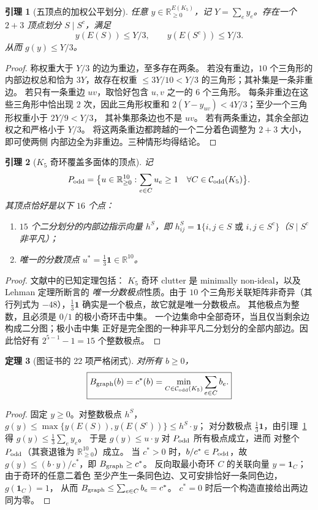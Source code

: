 \documentclass[11pt,a4paper]{ctexart}
\newtheorem{theorem}{定理}[section]
\newtheorem{lemma}[theorem]{引理}
\theoremstyle{remark}
\newcommand{\CE}{\mathcal C_{\rm odd}(K_5)}
\newcommand{\one}{\mathbf 1}
\newcommand{\N}{\mathbb R_{\ge0}}
\begin{document}
\begin{lemma}[五顶点的加权公平划分]\label{lem:split}
任意 $y\in\N^{E(K_5)}$，记 $Y=\sum_e y_e$。存在一个 $2+3$ 顶点划分
$S\mid S^c$，满足
\[
y(E(S))\le Y/3,\qquad y(E(S^c))\le Y/3.
\]
从而 $g(y)\le Y/3$。
\end{lemma}
\begin{proof}
称权重大于 $Y/3$ 的边为重边，至多存在两条。
若没有重边，$10$ 个三角形的内部边权总和恰为 $3Y$，故存在权重
$\le3Y/10<Y/3$ 的三角形；其补集是一条非重边。
若只有一条重边 $uv$，取恰好包含 $u,v$ 之一的 $6$ 个三角形。
每条非重边在这些三角形中恰出现 $2$ 次，因此三角形权重和
$2(Y-y_{uv})<4Y/3$；至少一个三角形权重小于 $2Y/9<Y/3$，
其补集那条边也不是 $uv$。
若有两条重边，其余全部边权之和严格小于 $Y/3$。
将这两条重边都跨越的一个二分着色调整为 $2+3$ 大小，即可使两侧
内部边全为非重边。三种情形均得结论。
\end{proof}

\begin{lemma}[$K_5$ 奇环覆盖多面体的顶点]\label{lem:cover}
记
\[
P_{\rm odd}=\bigl\{u\in\N^{10}:\sum_{e\in C}u_e\ge1\quad\forall C\in\CE\bigr\}.
\]
其顶点恰好是以下 $16$ 个点：
\begin{enumerate}
\item $15$ 个二分划分的内部边指示向量 $h^S$，即
$h^S_{ij}=\mathbf1\{i,j\in S\text{ 或 }i,j\in S^c\}$（$S\mid S^c$ 非平凡）；
\item 唯一的分数顶点 $u^*=\tfrac13\one\in\mathbb R^{10}$。
\end{enumerate}
\end{lemma}
\begin{proof}
文献\cite{cornuejols,padberg,lehmanlectures}中的已知定理包括：
$K_5$ 奇环 clutter 是 minimally non-ideal，以及 Lehman 定理所断言的
\emph{唯一分数极点}性质。由于 $10$ 个三角形关联矩阵非奇异（其行列式为
$-48$），$\tfrac13\one$ 确实是一个极点，故它就是唯一分数极点。
其他极点为整数，且必须是 $0/1$ 的极小奇环击中集。
一个边集命中全部奇环，当且仅当剩余边构成二分图；极小击中集
正好是完全图的一种非平凡二分划分的全部内部边。因此恰好有
$2^{5-1}-1=15$ 个整数极点。
\end{proof}

\begin{theorem}[图证书的 22 项严格闭式]\label{thm:graph}
对所有 $b\ge0$，
\begin{equation}\label{eq:graph}
\boxed{B_{\rm graph}(b)=c^*(b)=\min_{C\in\CE}\sum_{e\in C}b_e.}
\end{equation}
\end{theorem}
\begin{proof}
固定 $y\ge0$。对整数极点 $h^S$，
$g(y)\le\max\{y(E(S)),y(E(S^c))\}\le h^S\cdot y$；
对分数极点 $\tfrac13\one$，由引理~\ref{lem:split} 得
$g(y)\le\frac13\sum_e y_e$。
于是 $g(y)\le u\cdot y$ 对 $P_{\rm odd}$ 所有极点成立，进而
对整个 $P_{\rm odd}$（其衰退锥为 $\N^{10}$）成立。
当 $c^*>0$ 时，$b/c^*\in P_{\rm odd}$，故
$g(y)\le(b\cdot y)/c^*$，即 $B_{\rm graph}\ge c^*$。
反向取最小奇环 $C$ 的关联向量 $y=\one_C$；由于奇环的任意二着色
至少产生一条同色边、又可安排恰好一条同色边，$g(\one_C)=1$，
从而 $B_{\rm graph}\le\sum_{e\in C}b_e=c^*$。
$c^*=0$ 时后一个构造直接给出两边同为零。
\end{proof}
\end{document}
